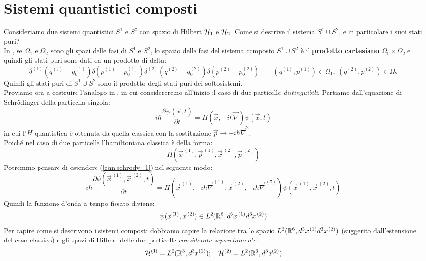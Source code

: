 \documentclass[../../FisicaTeorica.tex]{subfiles}
\begin{document}
\section{Sistemi quantistici composti}
Consideriamo due sistemi quantistici $S^1$ e $S^2$ con spazio di Hilbert $\mathcal{H}_1$ e $\mathcal{H}_2$. Come si descrive il sistema $S^1 \cup S^2$, e in particolare i suoi stati puri?\\

In \MC, se $\Omega_1$ e $\Omega_2$ sono gli spazi delle fasi di $S^1$ e $S^2$, lo spazio delle fasi del sistema composto $S^1 \cup S^2$ è il \textbf{prodotto cartesiano} $\Omega_1\times \Omega_2$ e quindi gli stati puri sono dati da un prodotto di delta:
\[
\delta^{(1)} (q^{(1)}-q_0^{(1)})\delta(p^{(1)}-p_0^{(1)}) \delta^{(2)}(q^{(2)}-q_0^{(2)})\delta(p^{(2)}-p_0^{(2)}) \qquad (q^{(1)}, p^{(1)})\in \Omega_1,\> (q^{(2)}, p^{(2)}) \in \Omega_2
\] 
Quindi gli stati puri di $S^1 \cup S^2$ sono il prodotto degli stati puri dei sottosistemi.\\

Proviamo ora a costruire l'analogo in \MQ, in cui considereremo all'inizio il caso di due particelle \textit{distinguibili}.  Partiamo dall'equazione di Schrödinger della particella singola:
\begin{equation}
i\hbar \frac{\partial \psi(\vec{x},t)}{\partial t}=H(\vec{x}, -i\hbar\vec{\nabla})\psi(\vec{x},t)
\label{eqn:schrody_1}
\end{equation}
in cui l'$H$ quantistica è ottenuta da quella classica con la sostituzione $\vec{p} \to -i\hbar\vec{\nabla}^2$.\\
Poiché nel caso di due particelle l'hamiltoniana classica è della forma:
\[
H(\vec{x}^{\,(1)}, \vec{p}^{\,(1)}, \vec{x}^{\,(2)}, \vec{p}^{\,(2)})
\]
Potremmo pensare di estendere (\ref{eqn:schrody_1}) nel seguente modo:
\[
i\hbar \frac{\partial \psi(\vec{x}^{\,(1)}, \vec{x}^{\,(2)},t)}{\partial t} = H(\vec{x}^{\,(1)},-i\hbar \vec{\nabla}^{\,(1)}, \vec{x}^{\,(2)}, -i\hbar\vec{\nabla}^{\,(2)})\psi(\vec{x}^{\,(1)},\vec{x}^{\,(2)},t)
\]
Quindi la funzione d'onda a tempo fissato diviene:
\[
\psi(\vec{x}^{\,(1)}, \vec{x}^{\,(2)})\in L^2(\mathbb{R}^6, d^3 x^{\,(1)} d^3 x^{\,(2)})
\]
Per capire come si descrivono i sistemi composti dobbiamo capire la relazione tra lo spazio $L^2(\mathbb{R}^6, d^3 x^{\,(1)} d^3 x^{\,(2)})$ (suggerito dall'estensione del caso classico) e gli spazi di Hilbert  delle due particelle \textit{considerate separatamente}:
\[
\mathcal{H}^{(1)}=L^2(\mathbb{R}^3, d^3 x^{(1)}); \quad \mathcal{H}^{(2)}=L^2(\mathbb{R}^3, d^3 x^{(2)})
\]
\end{document}
